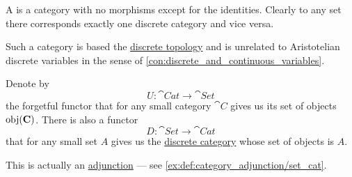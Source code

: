 \begin{definition}\label{def:discrete_category}
  A  is a category with no morphisms except for the identities. Clearly to any set there corresponds exactly one discrete category and vice versa.
\end{definition}
\begin{comments}
  \item Such a category is based the \hyperref[def:discrete_topology]{discrete topology} and is unrelated to Aristotelian discrete variables in the sense of \cref{con:discrete_and_continuous_variables}.
\end{comments}

\begin{example}\label{ex:discrete_category_adjunction}
  Denote by
  \begin{equation*}
    U: \cat{Cat} \to \cat{Set}
  \end{equation*}
  the forgetful functor that for any small category \( \cat{C} \) gives us its set of objects \( \obj(\cat{C}) \). There is also a functor
  \begin{equation*}
    D: \cat{Set} \to \cat{Cat}
  \end{equation*}
  that for any small set \( A \) gives us the \hyperref[def:discrete_category]{discrete category} whose set of objects is \( A \).

  This is actually an \hyperref[def:category_adjunction]{adjunction} --- see \cref{ex:def:category_adjunction/set_cat}.
\end{example}

